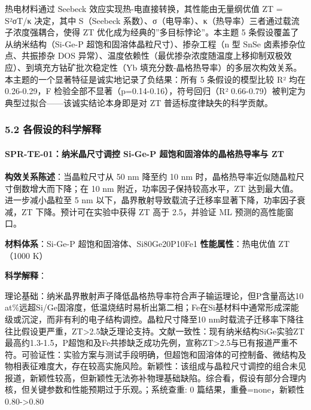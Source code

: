 \documentclass[12pt,a4paper]{ctexart}
\begin{document}
热电材料通过 Seebeck 效应实现热-电直接转换，其性能由无量纲优值 ZT = S²σT/κ 决定，其中 S（Seebeck 系数）、σ（电导率）、κ（热导率）三者通过载流子浓度强耦合，使得 ZT 优化成为经典的''多目标悖论''。本主题 5 条假设覆盖了从纳米结构（Si-Ge-P 超饱和固溶体晶粒尺寸）、掺杂工程（n 型 SnSe 卤素掺杂位点、共振掺杂 DOS 异常）、温度依赖性（最优掺杂浓度随温度上移抑制双极效应）、到填充方钴矿批次稳定性（Yb 填充分数-晶格热导率）的多层次构效关系。本主题的一个显著特征是诚实地记录了负结果：所有 5 条假设的模型比较 R² 均在 0.26-0.29，F 检验全部不显著（p=0.14-0.16），符号回归（R² 0.66-0.79）被判定为典型过拟合------该诚实结论本身即是对 ZT 普适标度律缺失的科学贡献。

\subsubsection{5.2 各假设的科学解释}\label{ux5404ux5047ux8bbeux7684ux79d1ux5b66ux89e3ux91ca-3}

\paragraph{SPR-TE-01：纳米晶尺寸调控 Si-Ge-P 超饱和固溶体的晶格热导率与 ZT}\label{spr-te-01ux7eb3ux7c73ux6676ux5c3aux5bf8ux8c03ux63a7-si-ge-p-ux8d85ux9971ux548cux56faux6eb6ux4f53ux7684ux6676ux683cux70edux5bfcux7387ux4e0e-zt}

\textbf{构效关系陈述}：当晶粒尺寸从 50 nm 降至约 10 nm 时，晶格热导率近似随晶粒尺寸倒数增大而下降；在 10 nm 附近，功率因子保持较高水平，ZT 达到最大值。进一步减小晶粒至 5 nm 以下，晶界散射导致载流子迁移率显著下降，功率因子衰减，ZT 下降。预计可在实验中获得 ZT 高于 2.5，并验证 ML 预测的高性能窗口。

\textbf{材料体系}：Si-Ge-P 超饱和固溶体、Si80Ge20P10Fe1 \textbar{} \textbf{性能属性}：热电优值 ZT（1000 K）

\textbf{科学解释}：

理论基础：纳米晶界散射声子降低晶格热导率符合声子输运理论，但P含量高达10 at\%远超Si/Ge固溶度，低温烧结时易析出第二相；Fe在Si基材料中通常形成深能级或沉淀，而非有利的电子结构调控。晶粒尺寸降至10 nm时载流子迁移率下降往往比假设更严重，ZT\textgreater2.5缺乏理论支持。文献一致性：现有纳米结构SiGe实验ZT最高约1.3-1.5，P超饱和及Fe共掺缺乏成功先例，宣称ZT\textgreater2.5与已有报道严重不符。可验证性：实验方案与测试手段明确，但超饱和固溶体的可控制备、微结构及物相表征难度大，存在较高实施风险。新颖性：该组成与晶粒尺寸调控的组合未见报道，新颖性较高，但新颖性无法弥补物理基础缺陷。综合看，假设有部分合理内核，但关键参数和性能预期过于乐观。；系统查重: 0 篇结果，重叠=none，新颖性 0.80-\textgreater0.80
\end{document}
